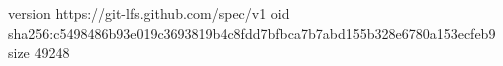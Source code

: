 version https://git-lfs.github.com/spec/v1
oid sha256:c5498486b93e019c3693819b4c8fdd7bfbca7b7abd155b328e6780a153ecfeb9
size 49248
